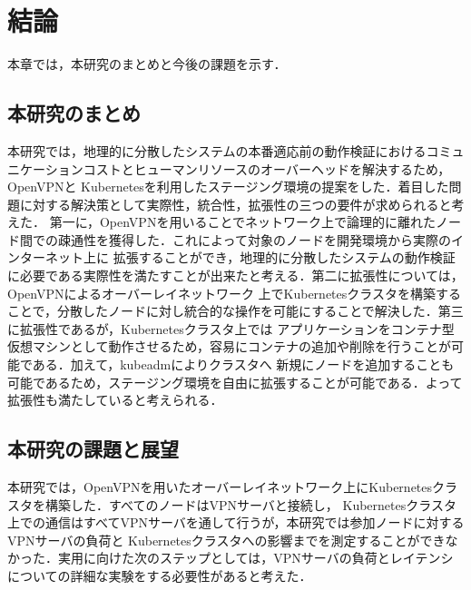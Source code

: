 \chapter{結論}
\label{conclusion}

本章では，本研究のまとめと今後の課題を示す．

\section{本研究のまとめ}
\label{conclusion:conclusion}

本研究では，地理的に分散したシステムの本番適応前の動作検証におけるコミュニケーションコストとヒューマンリソースのオーバーヘッドを解決するため，OpenVPNと
Kubernetesを利用したステージング環境の提案をした．着目した問題に対する解決策として実際性，統合性，拡張性の三つの要件が求められると考えた．
第一に，OpenVPNを用いることでネットワーク上で論理的に離れたノード間での疎通性を獲得した．これによって対象のノードを開発環境から実際のインターネット上に
拡張することができ，地理的に分散したシステムの動作検証に必要である実際性を満たすことが出来たと考える．第二に拡張性については，OpenVPNによるオーバーレイネットワーク
上でKubernetesクラスタを構築することで，分散したノードに対し統合的な操作を可能にすることで解決した．第三に拡張性であるが，Kubernetesクラスタ上では
アプリケーションをコンテナ型仮想マシンとして動作させるため，容易にコンテナの追加や削除を行うことが可能である．加えて，kubeadmによりクラスタへ
新規にノードを追加することも可能であるため，ステージング環境を自由に拡張することが可能である．よって拡張性も満たしていると考えられる．

\section{本研究の課題と展望}
\label{conclusion:issue}

本研究では，OpenVPNを用いたオーバーレイネットワーク上にKubernetesクラスタを構築した．すべてのノードはVPNサーバと接続し，
Kubernetesクラスタ上での通信はすべてVPNサーバを通して行うが，本研究では参加ノードに対するVPNサーバの負荷と
Kubernetesクラスタへの影響までを測定することができなかった．実用に向けた次のステップとしては，VPNサーバの負荷とレイテンシ
についての詳細な実験をする必要性があると考えた．

